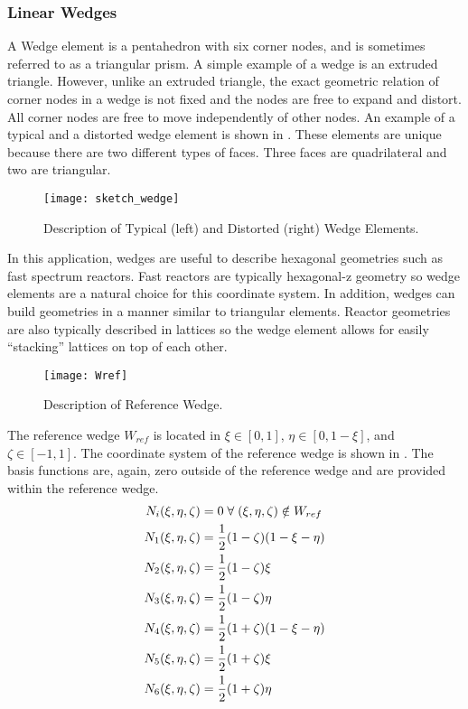     \subsubsection{Linear Wedges}
      A Wedge element is a pentahedron with six corner nodes, and is sometimes
      referred to as a triangular prism. A simple example of a wedge is an
      extruded triangle. However, unlike an extruded triangle, the exact 
      geometric relation of corner nodes in a wedge is not fixed and the nodes 
      are free to expand and distort. All corner nodes are free to move
      independently of other nodes. An example of a typical and a distorted
      wedge element is shown in . These elements are
      unique because there are two different types of faces. Three faces are
      quadrilateral and two are triangular. 

      \begin{figure}
        \centering
        \texttt{[image: sketch\_wedge]}
        \caption{Description of Typical (left) and Distorted (right) Wedge 
          Elements.}
        \label{fig:sketch_wedge}
      \end{figure}

      In this application,
      wedges are useful to describe hexagonal geometries such as fast spectrum
      reactors. Fast reactors are typically hexagonal-z geometry so wedge
      elements are a natural choice for this coordinate system. In addition,
      wedges can build geometries in a manner similar to triangular
      elements. Reactor geometries are also typically described in lattices so
      the wedge element allows for easily ``stacking'' lattices on top of each
      other.

      \begin{figure}
        \centering
        \texttt{[image: Wref]}
        \caption{Description of Reference Wedge.}
        \label{fig:Wref}
      \end{figure}

      The reference wedge $W_{ref}$ is located in 
      $\xi \in [0,1]$, $\eta \in [0,1-\xi]$, and $\zeta \in [-1,1]$. The
      coordinate system of the reference wedge is shown in . The
      basis functions are, again, zero outside of the reference wedge and are 
      provided within the reference wedge.
      \begin{align}
        N_i(\xi,\eta,\zeta) &= 0 \; \forall \; (\xi,\eta,\zeta)
          \notin W_{ref} \\
        N_1(\xi,\eta,\zeta) &= \frac{1}{2} (1-\zeta)(1-\xi-\eta) \\
        N_2(\xi,\eta,\zeta) &= \frac{1}{2} (1-\zeta)\xi \\
        N_3(\xi,\eta,\zeta) &= \frac{1}{2} (1-\zeta)\eta \\
        N_4(\xi,\eta,\zeta) &= \frac{1}{2} (1+\zeta)(1-\xi-\eta) \\
        N_5(\xi,\eta,\zeta) &= \frac{1}{2} (1+\zeta)\xi \\
        N_6(\xi,\eta,\zeta) &= \frac{1}{2} (1+\zeta)\eta 
      \end{align}

